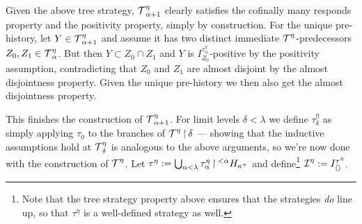 \documentclass[../../main]{subfiles}
\begin{document}
{	\qquad  Given the above tree strategy, $\operatorname{\mathcal T}^\eta_{\alpha+1}$ clearly satisfies the cofinally many responds property and the positivity property, simply by construction. For the unique pre-history, let $Y\in\operatorname{\mathcal T}^\eta_{\alpha+1}$ and assume it has two distinct immediate $\operatorname{\mathcal T}^\eta$-predecessors $Z_0,Z_1\in\operatorname{\mathcal T}^\eta_\alpha$. But then $Y\subset Z_0\cap Z_1$ and $Y$ is $I_{Z_0}^{\tau^\eta_\alpha}$-positive by the positivity assumption, contradicting that $Z_0$ and $Z_1$ are almost disjoint by the almost disjointness property. Given the unique pre-history we then also get the almost disjointness property.


 
\qquad This finishes the construction of $\operatorname{\mathcal T}^\eta_{\alpha+1}$. For limit levels $\delta<\lambda$ we define $\tau^\eta_\delta$ as simply applying $\tau_0$ to the branches of $\operatorname{\mathcal T}^\eta\operatorname{\upharpoonright}\delta$ --- showing that the inductive assumptions hold at $\operatorname{\mathcal T}^\eta_\delta$ is analogous to the above arguments, so we're now done with the construction of $\operatorname{\mathcal T}^\eta$. Let $\tau^\eta:=\bigcup_{\alpha<\lambda}\tau^\eta_\alpha\operatorname{\upharpoonright}{^{<\alpha}H_{\kappa^+}}$ and define\footnote{Note that the tree strategy property above ensures that the strategies \textit{do} line up, so that $\tau^\eta$ is a well-defined strategy as well.} $\operatorname{\mathcal I}^\eta:=I_{\langle \rangle}^{\tau^\eta}$.

}
\end{document}
